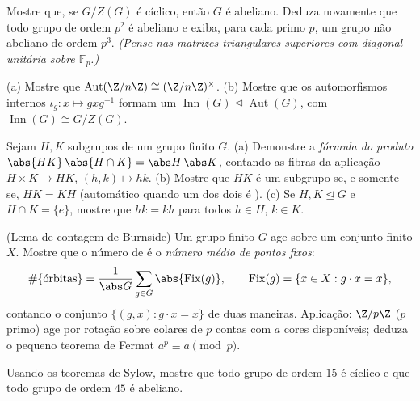 \begin{exercise}[$\star$]\label{exo:b3:groups:2}
Mostre que, se $G/Z(G)$ é cíclico, então $G$ é abeliano. Deduza
novamente que todo grupo de ordem $p^2$ é abeliano e exiba, para
cada primo $p$, um grupo não abeliano de ordem $p^3$.
\emph{(Pense nas matrizes triangulares superiores com diagonal unitária
sobre $\mathbb F_p$.)}
\end{exercise}

\begin{exercise}[$\star$]\label{exo:b3:groups:3}
(a) Mostre que $\operatorname{Aut}(\Z/n\Z) \cong (\Z/n\Z)^\times$.
(b) Mostre que os automorfismos internos $\iota_g \colon x \mapsto
gxg^{-1}$ formam um  $\operatorname{Inn}(G)
\trianglelefteq \operatorname{Aut}(G)$, com $\operatorname{Inn}(G) \cong G/Z(G)$.
\end{exercise}

\begin{exercise}[$\star\star$]\label{exo:b3:groups:4}
Sejam $H, K$ subgrupos de um grupo finito $G$.
(a) Demonstre a \emph{fórmula do produto} $\abs{HK}\,\abs{H\cap K} =
\abs H\, \abs K$, contando as fibras da
aplicação $H \times K
\to HK$, $(h,k) \mapsto hk$.
(b) Mostre que $HK$ é um subgrupo se, e somente se, $HK = KH$
(automático quando um dos dois é ).
(c) Se $H, K \trianglelefteq G$ e $H \cap K = \{e\}$, mostre que $hk = kh$ para todos $h \in H$, $k \in K$.
\end{exercise}

\begin{exercise}[$\star\star$]\label{exo:b3:groups:5}
(Lema de contagem de Burnside) Um grupo finito $G$ age sobre um
conjunto finito $X$. Mostre que o número de  é o
\emph{número médio de pontos fixos}:
\[
\#\{\text{órbitas}\} = \frac{1}{\abs G}\sum_{g \in G}
\abs{\operatorname{Fix}(g)},
\qquad \operatorname{Fix}(g) = \{x \in X : g \cdot x = x\},
\]
contando o conjunto $\{(g,x) : g\cdot x = x\}$ de duas maneiras. Aplicação: $\Z/p\Z$
($p$ primo) age por rotação sobre colares de $p$ contas com
$a$ cores disponíveis; deduza o pequeno teorema de Fermat $a^p \equiv a \pmod p$.
\end{exercise}

\begin{exercise}[$\star$]\label{exo:b3:groups:6}
Usando os teoremas de Sylow, mostre que todo grupo de ordem $15$ é
cíclico e que todo grupo de ordem $45$ é abeliano.
\end{exercise}

